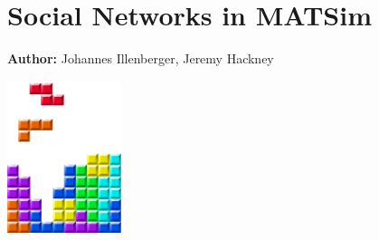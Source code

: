 \chapter{Social Networks in MATSim}
\label{ch:socnets}

\hfill \textbf{Author:} Johannes Illenberger, Jeremy Hackney

\begin{center} \includegraphics[width=0.25\textwidth, angle=0]{figures/MATSimBook.png} \end{center}


